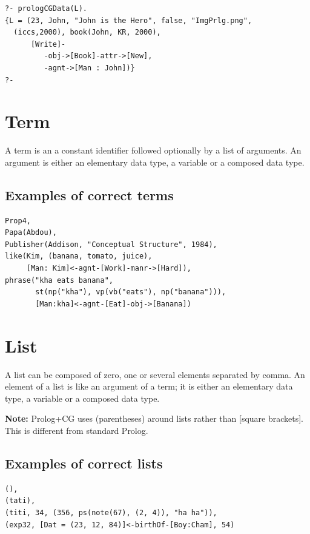 \documentclass{book}
\begin{document}
\begin{verbatim}
?- prologCGData(L).
{L = (23, John, "John is the Hero", false, "ImgPrlg.png", 
  (iccs,2000), book(John, KR, 2000),
      [Write]-
         -obj->[Book]-attr->[New],
         -agnt->[Man : John])}
?-
\end{verbatim}


\section{Term}\label{Sec:Term}

A term is an a
constant identifier followed optionally by a list of arguments.
An argument is either an elementary data
type, a variable or a composed data type.

\subsection{Examples of correct terms}


\begin{verbatim}
Prop4, 
Papa(Abdou), 
Publisher(Addison, "Conceptual Structure", 1984),
like(Kim, (banana, tomato, juice), 
     [Man: Kim]<-agnt-[Work]-manr->[Hard]),
phrase("kha eats banana", 
       st(np("kha"), vp(vb("eats"), np("banana"))),
       [Man:kha]<-agnt-[Eat]-obj->[Banana])
\end{verbatim}



\section{List}\label{Sec:List}

A list can be composed of zero, one or several elements separated
by comma. An element of a list is like an argument of a term; it is
either an elementary data type, a variable or a composed
data type.

{\bf Note:} Prolog+CG uses (parentheses) around lists rather than
[square brackets].  This is different from standard Prolog.

\subsection{Examples of correct lists}

\begin{verbatim}
(),
(tati),
(titi, 34, (356, ps(note(67), (2, 4)), "ha ha")),
(exp32, [Dat = (23, 12, 84)]<-birthOf-[Boy:Cham], 54)
\end{verbatim}
\end{document}
